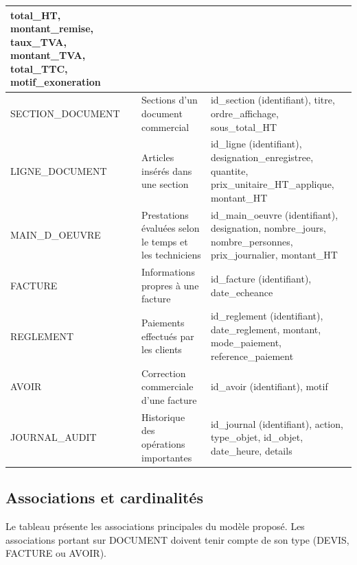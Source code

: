 \documentclass[11pt,a4paper]{article}
\begin{document}
{\begin{longtable}{|L{3.2cm}|L{4.2cm}|L{7.8cm}|}
  total\_HT, montant\_remise, taux\_TVA, montant\_TVA, total\_TTC,
  motif\_exoneration \\ \hline
SECTION\_DOCUMENT & Sections d'un document commercial &
  id\_section (identifiant), titre, ordre\_affichage, sous\_total\_HT \\ \hline
LIGNE\_DOCUMENT & Articles insérés dans une section &
  id\_ligne (identifiant), designation\_enregistree, quantite,
  prix\_unitaire\_HT\_applique, montant\_HT \\ \hline
MAIN\_D\_OEUVRE & Prestations évaluées selon le temps et les techniciens &
  id\_main\_oeuvre (identifiant), designation, nombre\_jours,
  nombre\_personnes, prix\_journalier, montant\_HT \\ \hline
FACTURE & Informations propres à une facture &
  id\_facture (identifiant), date\_echeance \\ \hline
REGLEMENT & Paiements effectués par les clients &
  id\_reglement (identifiant), date\_reglement, montant, mode\_paiement,
  reference\_paiement \\ \hline
AVOIR & Correction commerciale d'une facture &
  id\_avoir (identifiant), motif \\ \hline
JOURNAL\_AUDIT & Historique des opérations importantes &
  id\_journal (identifiant), action, type\_objet, id\_objet, date\_heure,
  details \\ \hline
\end{longtable}
}

\subsection{Associations et cardinalités}

Le tableau présente les associations principales du modèle proposé. Les
associations portant sur DOCUMENT doivent tenir compte de son type (DEVIS,
FACTURE ou AVOIR).
\end{document}
